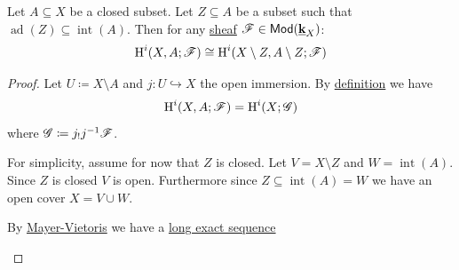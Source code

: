 \documentclass[../../main]{subfiles}
\begin{document}
\begin{theorem}[Excision]\label{thm:excision-axiom}
  Let \(A \subseteq X\) be a closed subset.
  Let \(Z \subseteq A\) be a subset such that \(\operatorname{ad}(Z) \subseteq \operatorname{int}(A)\).
  Then for any \hyperref[def:sheaf]{sheaf} \(\mathscr{F} \in \mathsf{Mod}(\underline{\mathbf{k}}_{X})\):
  \begin{equation*}
    \operatorname{H}^{i}(X, A; \mathscr{F}) \cong \operatorname{H}^{i}(X \setminus Z, A \setminus Z; \mathscr{F})
  \end{equation*}
\end{theorem}
\begin{proof}
  Let \(U \coloneq X \setminus A\) and \(j\colon U \hookrightarrow X\) the open immersion.
  By \hyperref[def:relative-sheaf-cohomology]{definition} we have
  \begin{equation*}
    \operatorname{H}^{i}(X, A; \mathscr{F}) = \operatorname{H}^{i}(X; \mathscr{G})
  \end{equation*}
  where \(\mathscr{G} \coloneq j_{!}j^{-1}\mathscr{F}\).

  For simplicity, assume for now that \(Z\) is closed.
  Let \(V = X \setminus Z\) and \(W = \operatorname{int}(A)\).
  Since \(Z\) is closed \(V\) is open. Furthermore since \(Z \subseteq \operatorname{int}(A) = W\) we have an open cover \(X = V \cup W\).

  By \hyperref[thm:mayer-vietoris-open]{Mayer-Vietoris} we have a \hyperref[def:exact-sequence]{long exact sequence}
  \begin{center}
  \end{center}


\end{proof}
\end{document}
